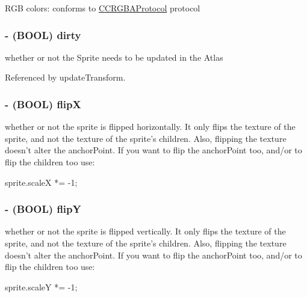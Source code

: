 R\-G\-B colors\-: conforms to \hyperlink{protocol_c_c_r_g_b_a_protocol-p}{C\-C\-R\-G\-B\-A\-Protocol} protocol \hypertarget{class_c_c_sprite_aa7ae3de20f2ba27c475b504021a7bbdd}{
\subsubsection[{dirty}]{\setlength{\rightskip}{0pt plus 5cm}-\/ (B\-O\-O\-L) {\bf dirty}}}\label{class_c_c_sprite_aa7ae3de20f2ba27c475b504021a7bbdd}
whether or not the Sprite needs to be updated in the Atlas 

Referenced by update\-Transform.

\hypertarget{class_c_c_sprite_a8b3b3793750b2ffadfd4764da13f5a21}{
\subsubsection[{flip\-X}]{\setlength{\rightskip}{0pt plus 5cm}-\/ (B\-O\-O\-L) {\bf flip\-X}}}\label{class_c_c_sprite_a8b3b3793750b2ffadfd4764da13f5a21}
whether or not the sprite is flipped horizontally. It only flips the texture of the sprite, and not the texture of the sprite's children. Also, flipping the texture doesn't alter the anchor\-Point. If you want to flip the anchor\-Point too, and/or to flip the children too use\-: \begin{DoxyVerb}   sprite.scaleX *= -1;\end{DoxyVerb}
 \hypertarget{class_c_c_sprite_ad1d4948982c1e8e2cb22be6e916435e1}{
\subsubsection[{flip\-Y}]{\setlength{\rightskip}{0pt plus 5cm}-\/ (B\-O\-O\-L) {\bf flip\-Y}}}\label{class_c_c_sprite_ad1d4948982c1e8e2cb22be6e916435e1}
whether or not the sprite is flipped vertically. It only flips the texture of the sprite, and not the texture of the sprite's children. Also, flipping the texture doesn't alter the anchor\-Point. If you want to flip the anchor\-Point too, and/or to flip the children too use\-: \begin{DoxyVerb}   sprite.scaleY *= -1;\end{DoxyVerb}
